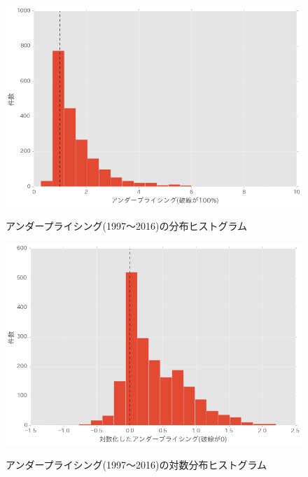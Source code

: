 \documentclass{jsarticle}
\begin{document}
\begin{figure}[!h]
  \begin{center}
  \caption{アンダープライシング(1997〜2016)の分布ヒストグラム}
    \includegraphics[clip,width=14cm]{./hist.png}
    \label{hist}
  \end{center}
\end{figure}

\begin{figure}[!h]
  \begin{center}
  \caption{アンダープライシング(1997〜2016)の対数分布ヒストグラム}
    \includegraphics[clip,width=14cm]{./loghist.png}
    \label{loghist}
  \end{center}
\end{figure}

\newpage
\end{document}
